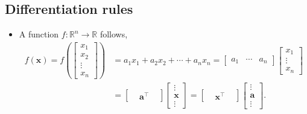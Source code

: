\documentclass[12pt,thmsa]{article}
\begin{document}
\subsection{Differentiation rules}
\begin{itemize}
	\item A function \(f: \mathbb{R}^{n} \rightarrow \mathbb{R}\) follows,
	\[ 
	\begin{aligned}
		f(\boldsymbol{x})
		=f \left(\left[ 
		\begin{array}{c}{x_{1}} \\ {x_{2}} \\ {\vdots} \\ {x_{n}}\end{array} 
		\right] \right)
		&=a_{1} x_{1}+a_{2} x_{2}+\cdots+a_{n} x_{n}
		=\left[ 
		\begin{array}{lll}{a_{1}} & {\cdots} & {a_{n}}\end{array} 
		\right]
		\left[ 
		\begin{array}{c}{x_{1}} \\ {\vdots} \\ {x_{n}}\end{array} 
		\right] \\
		& =\left[
		\begin{array}{ccc}{} & {\boldsymbol{a}^{\top}} & {}\end{array}
		\right]
		\left[
		\begin{array}{c}{\vdots} \\ { \boldsymbol{x}} \\ {\vdots} \end{array}
		\right] 
		=\left[
		\begin{array}{ccc}{} &  {\boldsymbol{x}^{\top}} & {}\end{array}
		\right]
		\left[
		\begin{array}{c}{\vdots} \\ { \boldsymbol{a}} \\ {\vdots} \end{array}
		\right]. 
	\end{aligned}
	\]
	

\end{itemize}
\end{document}
